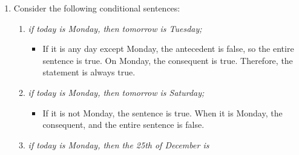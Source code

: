 \begin{enumerate}
\begin{enumerate}
{    die;}
    \begin{itemize}
    \item Exclusive
    \end{itemize}
  \item \emph{if I earn a lot of money or win the sweepstake, I shall
    go on a long journey.}
    \begin{itemize}
    \item Non-exclusive
    \end{itemize}
  \end{enumerate}
  Give further examples in which the word ``\emph{or}'' is used in its first
  or in its second meaning.
  \begin{itemize}
  \item \textbf{Exclusive:}
    \begin{itemize}
    \item \emph{The package will arrive Thursday or Friday.}
    \item \emph{Jefferson or Adams will be elected president.}
    \end{itemize}
  \item \textbf{Non-exclusive:}
    \begin{itemize}
    \item \emph{We have Coke or Pepsi.}
    \item \emph{It is hot outside, or the air conditioning is broken.}
    \end{itemize}
  \end{itemize}
\item Consider the following conditional sentences:
  \begin{enumerate}
  \item \emph{if today is Monday, then tomorrow is Tuesday;}
    \begin{itemize}
    \item If it is any day except Monday, the antecedent is false, so
      the entire sentence is true.  On Monday, the consequent is true.
      Therefore, the statement is always true.
    \end{itemize}
  \item \emph{if today is Monday, then tomorrow is Saturday;}
    \begin{itemize}
    \item If it is not Monday, the sentence is true.  When it is
      Monday, the consequent, and the entire sentence is false.
    \end{itemize}
  \item \emph{if today is Monday, then the 25th of December is
}
\end{enumerate}
\end{enumerate}
